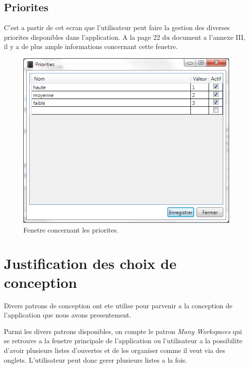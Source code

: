 \documentclass[letterpaper, oneside, 12pt, these, creativecommons]{thETS}
\begin{document}
\newpage

\subsection{Priorites}

C'est a partir de cet ecran que l'utilisateur peut faire la gestion des diverses priorites disponibles dans l'application. A la page 22 du document a l'annexe III, il y a de plus ample informations concernant cette fenetre.

\begin{figure}[H!]
	\centering
	\includegraphics[width=1\textwidth]{fenetre_priorite.png}
	\caption{Fenetre concernant les priorites.}
\end{figure}

\newpage

\section{Justification des choix de conception}

Divers patrons de conception ont ete utilise pour parvenir a la conception de l'application que nous avons presentement. 

Parmi les divers patrons disponibles, on compte le patron \emph{Many Workspaces} qui se retrouve a la fenetre principale de l'application ou l'utilisateur a la possibilite d'avoir plusieurs listes d'ouvertes et de les organiser comme il veut via des onglets. L'utilisateur peut donc gerer plusieurs listes a la fois. 
\end{document}
